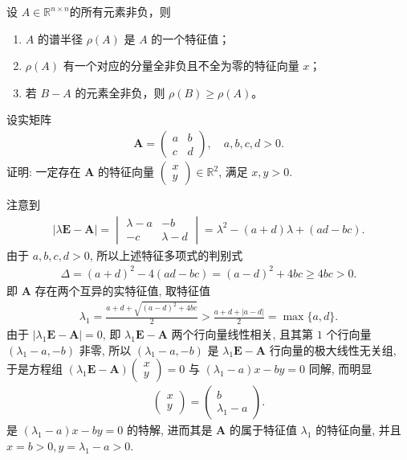 \documentclass[../../main.tex]{subfiles}%
\begin{document}
\begin{theorem}\label{theorem:Perron-Frobenius定理}
设 $A \in \mathbb{R}^{n \times n}$的所有元素非负，则
\begin{enumerate}[(1)]
\item $A$ 的谱半径 $\rho(A)$ 是 $A$ 的一个特征值；
\item $\rho(A)$ 有一个对应的分量全非负且不全为零的特征向量 $x$；
\item 若 $B-A$ 的元素全非负，则 $\rho(B) \geqslant \rho(A)$。
\end{enumerate}
\end{theorem}

\begin{example}
设实矩阵
\begin{align*}
\bm{A} = \begin{pmatrix} a & b \\ c & d \end{pmatrix}, \quad a, b, c, d > 0.
\end{align*}
证明: 一定存在 \(\bm{A}\) 的特征向量 \(\begin{pmatrix} x \\ y \end{pmatrix} \in \mathbb{R}^2\), 满足 \(x, y > 0\).
\end{example}
\begin{solution}
注意到
\begin{align*}
|\lambda \bm{E} - \bm{A}| = \begin{vmatrix} \lambda - a & -b \\ -c & \lambda - d \end{vmatrix} = \lambda^2 - (a+d)\lambda + (ad - bc).
\end{align*}
由于 \(a, b, c, d > 0\), 所以上述特征多项式的判别式
\begin{align*}
\Delta = (a+d)^2 - 4(ad-bc) = (a-d)^2 + 4bc \geqslant 4bc > 0.
\end{align*}
即 \(\bm{A}\) 存在两个互异的实特征值, 取特征值
\begin{align*}
\lambda_1 = \frac{a+d + \sqrt{(a-d)^2+4bc}}{2} > \frac{a+d + |a-d|}{2} = \max\{a, d\}.
\end{align*}
由于 \(|\lambda_1 \bm{E} - \bm{A}| = 0\), 即 \(\lambda_1 \bm{E} - \bm{A}\) 两个行向量线性相关, 且其第 \(1\) 个行向量 \((\lambda_1 - a, -b)\) 非零, 所以 \((\lambda_1 - a, -b)\) 是 \(\lambda_1 \bm{E} - \bm{A}\) 行向量的极大线性无关组, 于是方程组
$(\lambda_1 \bm{E} - \bm{A}) \begin{pmatrix} x \\ y \end{pmatrix} = 0$ 与 $(\lambda_1 - a)x - by = 0$ 同解, 而明显
\begin{align*}
\begin{pmatrix} x \\ y \end{pmatrix} = \begin{pmatrix} b \\ \lambda_1 - a \end{pmatrix}.
\end{align*}
是 \((\lambda_1 - a)x - by = 0\) 的特解, 进而其是 \(\bm{A}\) 的属于特征值 \(\lambda_1\) 的特征向量, 并且 \(x = b > 0, y = \lambda_1 - a > 0.\) 
\end{solution}
\end{document}
